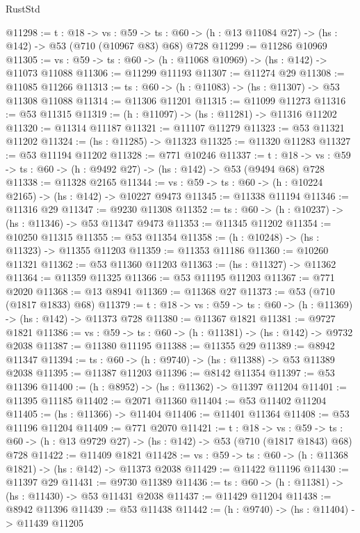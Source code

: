 \begin{lexlean}{RustStd}
\begin{coremodule}
@11298 := {t : @18} ->
  {vs : @59} ->
  {ts : @60} -> (h : @13 @11084 @27) -> (hs : @142) -> @53 (@710 (@10967 @83) @68) @728
@11299 := @11286 @10969
@11305 := {vs : @59} -> {ts : @60} -> (h : @11068 @10969) -> (hs : @142) -> @11073 @11088
@11306 := @11299 @11193
@11307 := @11274 @29
@11308 := @11085 @11266
@11313 := {ts : @60} -> (h : @11083) -> (hs : @11307) -> @53 @11308 @11088
@11314 := @11306 @11201
@11315 := @11099 @11273
@11316 := @53 @11315
@11319 := (h : @11097) -> (hs : @11281) -> @11316 @11202
@11320 := @11314 @11187
@11321 := @11107 @11279
@11323 := @53 @11321 @11202
@11324 := (hs : @11285) -> @11323
@11325 := @11320 @11283
@11327 := @53 @11194 @11202
@11328 := @771 @10246
@11337 := {t : @18} ->
  {vs : @59} -> {ts : @60} -> (h : @9492 @27) -> (hs : @142) -> @53 (@9494 @68) @728
@11338 := @11328 @2165
@11344 := {vs : @59} -> {ts : @60} -> (h : @10224 @2165) -> (hs : @142) -> @10227 @9473
@11345 := @11338 @11194
@11346 := @11316 @29
@11347 := @9230 @11308
@11352 := {ts : @60} -> (h : @10237) -> (hs : @11346) -> @53 @11347 @9473
@11353 := @11345 @11202
@11354 := @10250 @11315
@11355 := @53 @11354
@11358 := (h : @10248) -> (hs : @11323) -> @11355 @11203
@11359 := @11353 @11186
@11360 := @10260 @11321
@11362 := @53 @11360 @11203
@11363 := (hs : @11327) -> @11362
@11364 := @11359 @11325
@11366 := @53 @11195 @11203
@11367 := @771 @2020
@11368 := @13 @8941
@11369 := @11368 @27
@11373 := @53 (@710 (@1817 @1833) @68)
@11379 := {t : @18} -> {vs : @59} -> {ts : @60} -> (h : @11369) -> (hs : @142) -> @11373 @728
@11380 := @11367 @1821
@11381 := @9727 @1821
@11386 := {vs : @59} -> {ts : @60} -> (h : @11381) -> (hs : @142) -> @9732 @2038
@11387 := @11380 @11195
@11388 := @11355 @29
@11389 := @8942 @11347
@11394 := {ts : @60} -> (h : @9740) -> (hs : @11388) -> @53 @11389 @2038
@11395 := @11387 @11203
@11396 := @8142 @11354
@11397 := @53 @11396
@11400 := (h : @8952) -> (hs : @11362) -> @11397 @11204
@11401 := @11395 @11185
@11402 := @2071 @11360
@11404 := @53 @11402 @11204
@11405 := (hs : @11366) -> @11404
@11406 := @11401 @11364
@11408 := @53 @11196 @11204
@11409 := @771 @2070
@11421 := {t : @18} ->
  {vs : @59} ->
  {ts : @60} -> (h : @13 @9729 @27) -> (hs : @142) -> @53 (@710 (@1817 @1843) @68) @728
@11422 := @11409 @1821
@11428 := {vs : @59} -> {ts : @60} -> (h : @11368 @1821) -> (hs : @142) -> @11373 @2038
@11429 := @11422 @11196
@11430 := @11397 @29
@11431 := @9730 @11389
@11436 := {ts : @60} -> (h : @11381) -> (hs : @11430) -> @53 @11431 @2038
@11437 := @11429 @11204
@11438 := @8942 @11396
@11439 := @53 @11438
@11442 := (h : @9740) -> (hs : @11404) -> @11439 @11205

\end{coremodule}
\end{lexlean}
